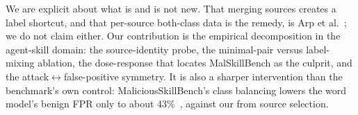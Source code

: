 \documentclass[conference]{IEEEtran}
\begin{document}
We are explicit about what is and is not new. That merging sources creates a label shortcut, and that
per-source both-class data is the remedy, is Arp et al.~\cite{arp2022}; we do not claim either. Our
contribution is the empirical decomposition in the agent-skill domain: the source-identity probe, the
minimal-pair versus label-mixing ablation, the dose-response that locates MalSkillBench as the culprit,
and the attack$\leftrightarrow$false-positive symmetry. It is also a sharper intervention than the
benchmark's own control: MaliciousSkillBench's class balancing lowers the word model's benign FPR only to
about 43\%~\cite{msb2026}, against our \FprMixed{} from source selection.





\end{document}

